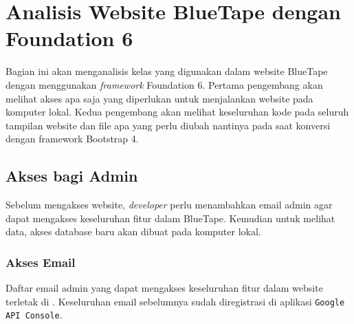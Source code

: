 \chapter{Analisis Website BlueTape dengan Foundation 6}
Bagian ini akan menganalisis kelas yang digunakan dalam website BlueTape dengan menggunakan \textit{framework} Foundation 6. Pertama pengembang akan melihat akses apa saja yang diperlukan untuk menjalankan website pada komputer lokal. Kedua pengembang akan melihat keseluruhan kode pada seluruh tampilan website dan file apa yang perlu diubah nantinya pada saat konversi dengan framework Bootstrap 4.
 
\section{Akses bagi Admin}
Sebelum mengakses website, \textit{developer} perlu menambahkan email admin agar dapat mengakses keseluruhan fitur dalam BlueTape. Kemudian untuk melihat data, akses database baru akan dibuat pada komputer lokal.

\subsection{Akses Email}
Daftar email admin yang dapat mengakses keseluruhan fitur dalam website terletak di . Keseluruhan email sebelumnya sudah diregistrasi di aplikasi \texttt{Google API Console}.\\

